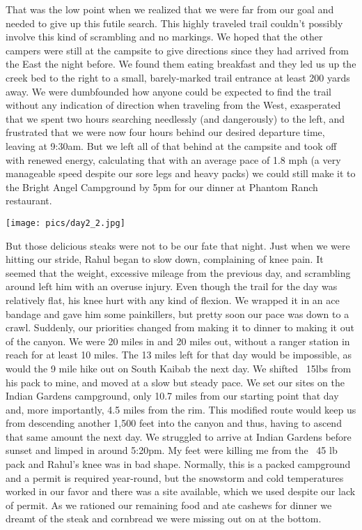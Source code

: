 \documentclass[10pt,a4paper]{article}
\newenvironment{Figure}
  {\par\medskip\noindent\minipage{\linewidth}}
  {\endminipage\par\medskip}
\begin{document}
\begin{multicols}{2}
 That was the low point when we realized that we were far from our goal and needed to give up this futile search. This highly traveled trail couldn't possibly involve this kind of scrambling and no markings. We hoped that the other campers were still at the campsite to give directions since they had arrived from the East the night before. We found them eating breakfast and they led us up the creek bed to the right to a small, barely-marked trail entrance at least 200 yards away. We were dumbfounded how anyone could be expected to find the trail without any indication of direction when traveling from the West, exasperated that we spent two hours searching needlessly (and dangerously) to the left, and frustrated that we were now four hours behind our desired departure time, leaving at 9:30am. But we left all of that behind at the campsite and took off with renewed energy, calculating that with an average pace of 1.8 mph (a very manageable speed despite our sore legs and heavy packs) we could still make it to the Bright Angel Campground by 5pm for our dinner at Phantom Ranch restaurant. 

\begin{Figure}
 \centering
 \texttt{[image: pics/day2\_2.jpg]}
\end{Figure}

But those delicious steaks were not to be our fate that night. Just when we were hitting our stride, Rahul began to slow down, complaining of knee pain. It seemed that the weight, excessive mileage from the previous day, and scrambling around left him with an overuse injury. Even though the trail for the day was relatively flat, his knee hurt with any kind of flexion. We wrapped it in an ace bandage and gave him some painkillers, but pretty soon our pace was down to a crawl. Suddenly, our priorities changed from making it to dinner to making it out of the canyon. We were 20 miles in and 20 miles out, without a ranger station in reach for at least 10 miles. The 13 miles left for that day would be impossible, as would the 9 mile hike out on South Kaibab the next day. We shifted ~15lbs from his pack to mine, and moved at a slow but steady pace. We set our sites on the Indian Gardens campground, only 10.7 miles from our starting point that day and, more importantly, 4.5 miles from the rim. This modified route would keep us from descending another 1,500 feet into the canyon and thus, having to ascend that same amount the next day. We struggled to arrive at Indian Gardens before sunset and limped in around 5:20pm.  My feet were killing me from the ~45 lb pack and Rahul's knee was in bad shape. Normally, this is a packed campground and a permit is required year-round, but the snowstorm and cold temperatures worked in our favor and there was a site available, which we used despite our lack of permit. As we rationed our remaining food and ate cashews for dinner we dreamt of the steak and cornbread we were missing out on at the bottom. 


\end{multicols}
\end{document}
